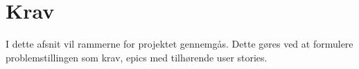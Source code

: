 \chapter{Krav}
\label{cha:requirements}

I dette afsnit vil rammerne for projektet gennemgås. Dette gøres ved at formulere problemstillingen som krav, epics \cite[Epic]{converge-terms} med tilhørende user stories.

